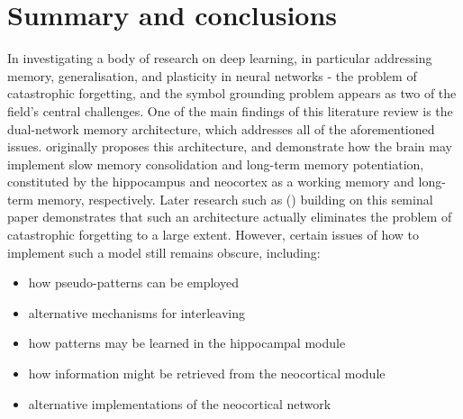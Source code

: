 \section{Summary and conclusions}

In investigating a body of research on deep learning, in particular addressing memory, generalisation, and plasticity in neural networks - the problem of catastrophic forgetting, and the symbol grounding problem appears as two of the field's central challenges. One of the main findings of this literature review is the dual-network memory architecture, which addresses all of the aforementioned issues. \cite{McClelland1995} originally proposes this architecture, and demonstrate how the brain may implement slow memory consolidation and long-term memory potentiation, constituted by the hippocampus and neocortex as a working memory and long-term memory, respectively. Later research such as (\cite{French1997, Ans1997, Ans2000, French2001, Hattori2010, Hattori2014}) building on this seminal paper demonstrates that such an architecture actually eliminates the problem of catastrophic forgetting to a large extent. However, certain issues of how to implement such a model still remains obscure, including:
\begin{itemize}
\item how pseudo-patterns can be employed
\item alternative mechanisms for interleaving
\item how patterns may be learned in the hippocampal module
\item how information might be retrieved from the neocortical module
\item alternative implementations of the neocortical network
\end{itemize}

